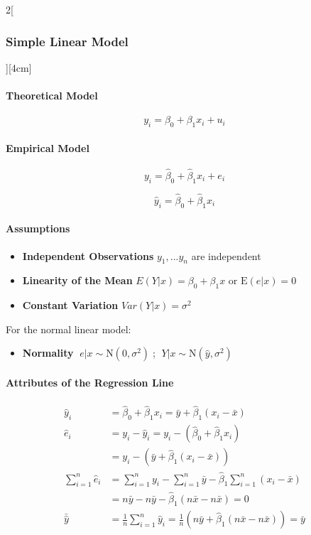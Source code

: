 \documentclass[8pt]{extarticle}
\begin{document}
\begin{multicols}{2}[\subsubsection{Simple Linear Model}][4cm]



\paragraph{Theoretical Model}

$$y_i=\beta_0+\beta_1x_i+u_i$$

\paragraph{Empirical Model}

$$y_i=\hat{\beta}_0+\hat{\beta}_1x_i+e_i$$

$$\hat{y}_i=\hat{\beta}_0+\hat{\beta}_1x_i$$

\paragraph{Assumptions}

\begin{itemize}
\item \textbf{Independent Observations} $y_1,...y_n$ are independent
\item \textbf{Linearity of the Mean} $E(Y|x)= \beta_0 + \beta_1x$ or $\mathrm{E}(e|x)= 0$  
\item \textbf{Constant Variation} $Var(Y|x) = \sigma^2$
\end{itemize}
For the normal linear model:
\begin{itemize}
\item \textbf{Normality} $\;e|x \sim \mathrm{N}(0,\sigma^2)\;$; $\;Y|x \sim \mathrm{N}(\hat{y},\sigma^2)\;$
\end{itemize}

\paragraph{Attributes of the Regression Line}
\begin{align*}
\hat{y}_i & = \hat{\beta}_0+\hat{\beta}_1x_i  =\bar{y}+ \hat{\beta}_1(x_i-\bar{x}) \\
\hat{e}_i  & =  y_i-\hat{y}_i = y_i-(\hat{\beta}_0+\hat{\beta}_1x_i) \\
 & =y_i-(\bar{y}+ \hat{\beta}_1(x_i-\bar{x})) \\
\sum\limits_{i=1}^n\hat{e}_i & = \sum\limits_{i=1}^ny_i-\sum\limits_{i=1}^n\bar{y}-\hat{\beta}_1\sum\limits_{i=1}^n(x_i-\bar{x}) \\
 & = n\bar{y}-n\bar{y}-\hat{\beta}_1(n\bar{x}-n\bar{x})=0 \\
\bar{\hat{y}} & = \frac{1}{n}\sum\limits_{i=1}^n\hat{y}_i=\frac{1}{n}(n\bar{y}+\hat{\beta}_1(n\bar{x} - n\bar{x})) = \bar{y}
\end{align*}


\end{multicols}
\end{document}
